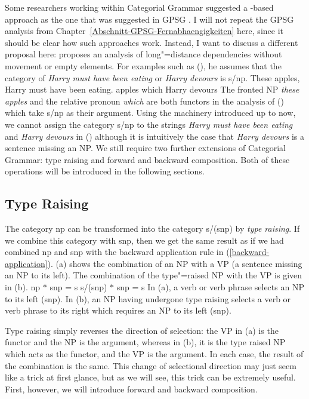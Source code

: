 {}
Some researchers working within Categorial Grammar suggested a \slasch-based approach as the one
that was suggested in GPSG \citep{Oehrle90a-u,Jacobson2025a}. I will not repeat the GPSG analysis from
Chapter~\ref{Abschnitt-GPSG-Fernabhaengigkeiten} here, since it should be clear how such approaches
work. Instead, I want to discuss a different proposal here: 
\citet[Section~1.2.4]{Steedman89a} proposes an analysis of long"=distance dependencies without movement or empty elements. For examples such as (), he assumes that
the category of \emph{Harry must have been eating} or \emph{Harry devours} is s/np.
\eal
\ex\label{Bsp-these-apples}
These apples, Harry must have been eating.
\ex apples which Harry devours
\zl
The fronted NP \emph{these apples} and the relative pronoun \emph{which} are both functors in the
analysis of () which take s/np as their argument. Using the machinery introduced up to now,
we cannot assign the category s/np to the strings \emph{Harry must have been eating} and \emph{Harry
  devours} in () although it is intuitively the case that \emph{Harry devours} is a sentence
missing an NP. We still require two further extensions of Categorial Grammar: type raising and forward and backward
composition. Both of these operations will be introduced in the following
sections.  

\subsection{Type Raising}
\label{sec-typeraising}

\addlines
The category np can be transformed into the category s/(s\bs np) by \emph{type raising}. If we combine this category with s\bs np, then we get the same result as if we had
combined np and s\bs np with the backward application rule in
(\ref{backward-application}). (a) shows the combination of an NP with a VP (a sentence
missing an NP to its left). The combination of the type"=raised NP with the VP is given in
(b). 
\eal
\ex np $*$ s\bs np = s 
\ex s/(s\bs np) $*$ s\bs np = s
\zl
In (a), a verb or verb phrase selects an NP to its left (s\bs np). In (b), an NP
having undergone type raising selects a verb or verb phrase to its right which requires an NP to its
left (s\bs np).  

Type raising simply reverses the direction of selection: the VP in (a) is the functor and the
NP is the argument, whereas in (b), it is the type raised NP which acts as the functor, and
the VP is the argument. In each case, the result of the combination is the same. This change of
selectional direction may just seem like a trick at first glance, but as we will see, this trick can
be extremely useful. First, however, we will introduce forward and backward composition.

